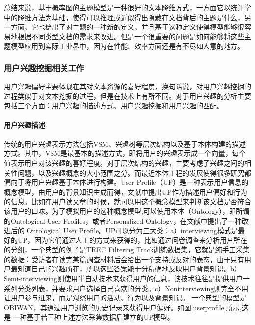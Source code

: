 总结来说，基于概率图的主题模型是一种很好的文本降维方式，一方面它以统计学中的降维方法为基础，使得可以推理或近似得出隐藏在文档背后的主题是什么，另一方面，它也给出了对主题的一种新的定义，并且基于这种定义使得模型能够很容易地根据不同类型文档的需求来改进。但是一个很重要的问题是如何能够将这些主题模型应用到实际工业界中，因为在性能、效率方面还是有不尽如人意的地方。

\subsubsection{用户兴趣挖掘相关工作}
用户兴趣偏好主要体现在其对文本资源的喜好程度，换句话说，对用户兴趣挖掘的过程类似于对文本挖掘的过程，但是在技术上有所不同。对于用户兴趣的分析主要包括三个方面：用户兴趣的描述方式、用户兴趣挖掘和用户兴趣的匹配。

\paragraph{用户兴趣描述}
传统的用户兴趣表示方法包括VSM\cite{gong2012personalized}、兴趣树等层次结构\cite{kim2003learning}以及基于本体构建的描述方式。其中，VSM是最基本的描述方式，即将用户的兴趣表示成一个向量，每个值表示用户对该兴趣的喜好程度。对于层次结构的兴趣，主要考虑了兴趣之间的相关性问题，以及兴趣概念的大小范围之分。而最近本体工程的发展使得很多研究都偏向于将用户兴趣基于本体进行构建。User Profile（UP）是一种表示用户信息的概念模型，由用户的背景知识生成而得，文献\cite{li2006mining,tao2011personalized}中提出UP作为描述用户偏好和行为的信息。比如在用户读文章的时候，就可以用这个概念模型来判断该文档是否符合该用户的口味。为了模拟用户的这种概念模型,可以使用本体（Ontology），即所谓的Ontological User Profiles\cite{pretschner1999ontology,sieg2007web}，或者Personalized Ontology\cite{tao2007ontology}，在文献\cite{trajkova2004improving}中提出了一种改进后的 Ontological User Profile。UP可以分为三大类：a）interviewing模式是最好的UP，因为它们通过人工的方式来获得的，比如通过问卷调查来分析用户所在的分组，一个典型的例子是TREC Filtering Track训练数据集，它就是纯手工采集的数据：受访者在读完某篇调查材料后会给出一个支持或反对的表态，由于只有用户最知道自己的兴趣所在，所以这些答案能十分精确地反映用户背景知识。b）Semi-interviewing则使用半自动技术来获得用户的信息，该技术往往是提供用户一系列分类列表，并要求用户选择自己喜欢的分类。c）Noninterviewing则完全不用让用户参与进来，而是观察用户的活动、行为以及背景知识。 一个典型的模型是OBIWAN，其通过用户浏览的历史记录来获得用户偏好。如图\ref{userprofile}所示,这是 一种基于若干种上述方法采集数据后建立的UP模型\cite{sieg2007learning}。

